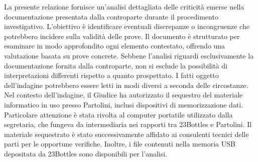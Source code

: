 La presente relazione fornisce un’analisi dettagliata delle criticità emerse nella documentazione presentata dalla controparte durante il procedimento investigativo. L’obiettivo è identificare eventuali discrepanze o incongruenze che potrebbero incidere sulla validità delle prove. Il documento è strutturato per esaminare in modo approfondito ogni elemento contestato, offrendo una valutazione basata su prove concrete.
Sebbene l’analisi riguardi esclusivamente la documentazione fornita dalla controparte, non si esclude la possibilità di interpretazioni differenti rispetto a quanto prospettato. I fatti oggetto dell’indagine potrebbero essere letti in modi diversi a seconda delle circostanze.
Nel contesto dell’indagine, il Giudice ha autorizzato il sequestro del materiale informatico in uso presso Partolini, inclusi dispositivi di memorizzazione dati. Particolare attenzione è stata rivolta al computer portatile utilizzato dalla segretaria, che fungeva da intermediaria nei rapporti tra 23Bottles e Partolini.
Il materiale sequestrato è stato successivamente affidato ai consulenti tecnici delle parti per le opportune verifiche. Inoltre, i file contenuti nella memoria USB depositata da 23Bottles sono disponibili per l’analisi.
\vspace{14pt}\\
